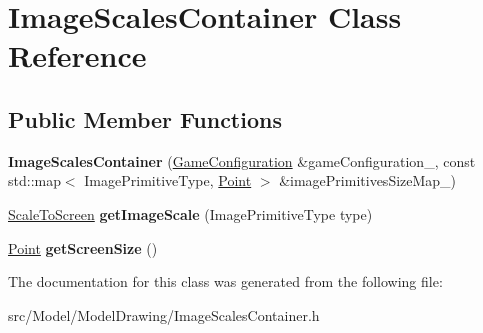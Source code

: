 \hypertarget{classImageScalesContainer}{}\section{Image\+Scales\+Container Class Reference}
\label{classImageScalesContainer}
\subsection*{Public Member Functions}
\begin{DoxyCompactItemize}
\item 
{\bfseries Image\+Scales\+Container} (\hyperlink{classGameConfiguration}{Game\+Configuration} \&game\+Configuration\+\_\+, const std\+::map$<$ Image\+Primitive\+Type, \hyperlink{classPoint}{Point} $>$ \&image\+Primitives\+Size\+Map\+\_\+)\hypertarget{classImageScalesContainer_a7b3dabbfeb70082e1b54ab0f34344380}{}\label{classImageScalesContainer_a7b3dabbfeb70082e1b54ab0f34344380}

\item 
\hyperlink{classScaleToScreen}{Scale\+To\+Screen} {\bfseries get\+Image\+Scale} (Image\+Primitive\+Type type)\hypertarget{classImageScalesContainer_ade2c65ef2528b5354906f8e5625a12d6}{}\label{classImageScalesContainer_ade2c65ef2528b5354906f8e5625a12d6}

\item 
\hyperlink{classPoint}{Point} {\bfseries get\+Screen\+Size} ()\hypertarget{classImageScalesContainer_a93cf314cbc3a2230120799f7a68f5353}{}\label{classImageScalesContainer_a93cf314cbc3a2230120799f7a68f5353}

\end{DoxyCompactItemize}


The documentation for this class was generated from the following file\+:\begin{DoxyCompactItemize}
\item 
src/\+Model/\+Model\+Drawing/Image\+Scales\+Container.\+h\end{DoxyCompactItemize}
